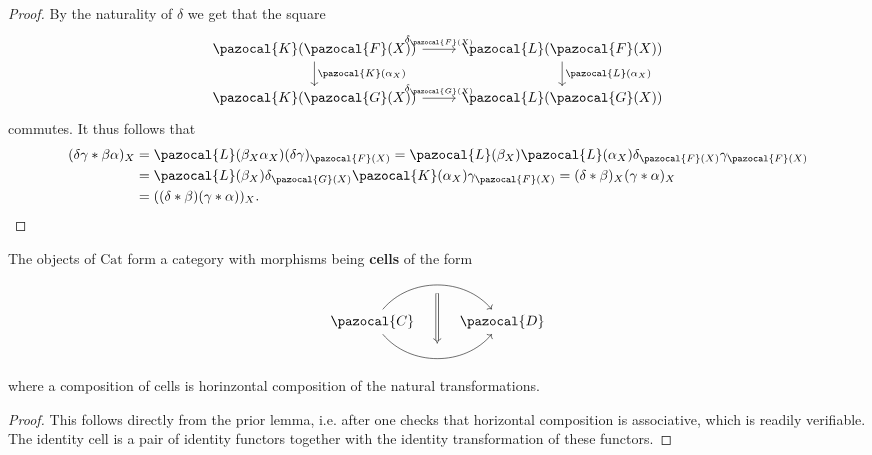 \begin{proof}
    By the naturality of $\delta$ we get that the square 
    $$
        \begin{tikzcd}
            \pazocal{K}(\pazocal{F}(X)) \arrow[r, "\delta_{\pazocal{F}(X)}"] \arrow[d,"\pazocal{K}(\alpha_X)"] & \pazocal{L}(\pazocal{F}(X)) \arrow[d, "\pazocal{L}(\alpha_X)"]\\
            \pazocal{K}(\pazocal{G}(X)) \arrow[r,"\delta_{\pazocal{G}(X)}"] & \pazocal{L}(\pazocal{G}(X))
        \end{tikzcd}
    $$
    commutes. It thus follows that 
    \begin{align*}
        (\delta\gamma \ast \beta\alpha)_X &= \pazocal{L}(\beta_X\alpha_X)(\delta\gamma)_{\pazocal{F}(X)} = \pazocal{L}(\beta_X)\pazocal{L}(\alpha_X)\delta_{\pazocal{F}(X)}\gamma_{\pazocal{F}(X)}\\
        &= \pazocal{L}(\beta_X)\delta_{\pazocal{G}(X)} \pazocal{K}(\alpha_X)\gamma_{\pazocal{F}(X)}= (\delta \ast \beta)_X (\gamma\ast\alpha)_X\\
        &=((\delta\ast\beta)(\gamma\ast \alpha))_X.
    \end{align*}
\end{proof}
\begin{proposition}
    The objects of $\mathrm{Cat}$ form a category with morphisms being \textbf{cells} of the form 
    $$
        \begin{tikzcd}
            \pazocal{C} \arrow[r, bend right=50,""{name=1}]\arrow[r,bend left=50,""{name=2}] & \pazocal{D} \arrow[Rightarrow, from=2, to=1, shorten <= 6, shorten >= 6] 
        \end{tikzcd}
    $$ 
    where a composition of cells is horinzontal composition of the natural transformations. 
\end{proposition}
\begin{proof}
    This follows directly from the prior lemma, i.e. after one checks that horizontal composition is associative, which is readily verifiable. The identity cell is a pair of identity functors together with the identity transformation of these functors. 
\end{proof}

